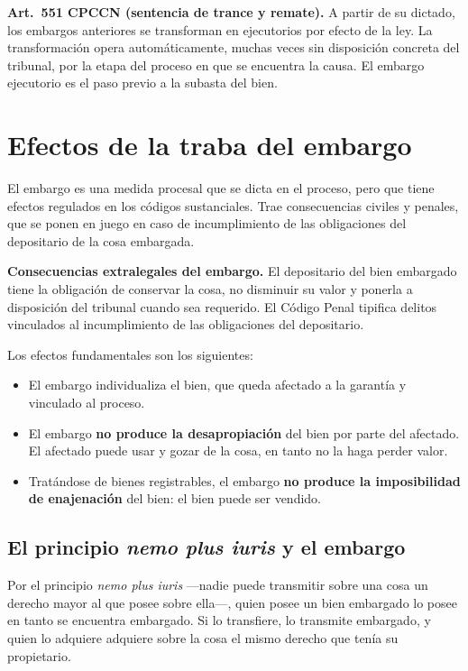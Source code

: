 \documentclass[12pt,oneside]{book}
\begin{document}
\begin{important}
\textbf{Art.\ 551 CPCCN (sentencia de trance y remate).} A partir de su dictado, los embargos anteriores se transforman en ejecutorios por efecto de la ley. La transformación opera automáticamente, muchas veces sin disposición concreta del tribunal, por la etapa del proceso en que se encuentra la causa. El embargo ejecutorio es el paso previo a la subasta del bien.
\end{important}

\section{Efectos de la traba del embargo}

El embargo es una medida procesal que se dicta en el proceso, pero que tiene efectos regulados en los códigos sustanciales. Trae consecuencias civiles y penales, que se ponen en juego en caso de incumplimiento de las obligaciones del depositario de la cosa embargada.

\begin{important}
\textbf{Consecuencias extralegales del embargo.} El depositario del bien embargado tiene la obligación de conservar la cosa, no disminuir su valor y ponerla a disposición del tribunal cuando sea requerido. El Código Penal tipifica delitos vinculados al incumplimiento de las obligaciones del depositario.
\end{important}

Los efectos fundamentales son los siguientes:
\begin{itemize}
    \item El embargo individualiza el bien, que queda afectado a la garantía y vinculado al proceso.
    \item El embargo \textbf{no produce la desapropiación} del bien por parte del afectado. El afectado puede usar y gozar de la cosa, en tanto no la haga perder valor.
    \item Tratándose de bienes registrables, el embargo \textbf{no produce la imposibilidad de enajenación} del bien: el bien puede ser vendido.
\end{itemize}

\subsection{El principio \textit{nemo plus iuris} y el embargo}

Por el principio \textit{nemo plus iuris} ---nadie puede transmitir sobre una cosa un derecho mayor al que posee sobre ella---, quien posee un bien embargado lo posee en tanto se encuentra embargado. Si lo transfiere, lo transmite embargado, y quien lo adquiere adquiere sobre la cosa el mismo derecho que tenía su propietario.
\end{document}
